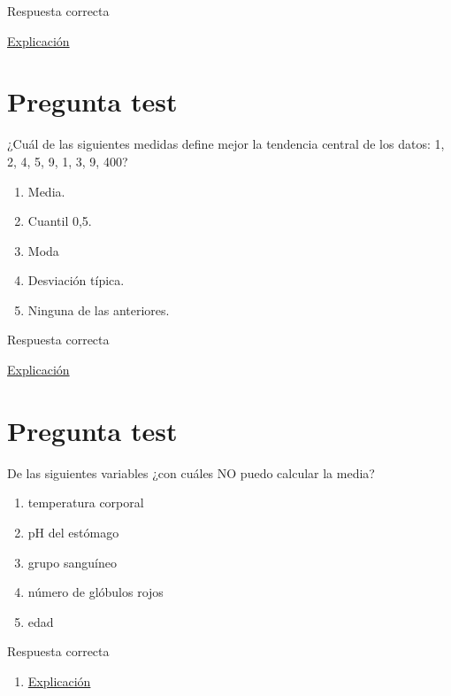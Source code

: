 \documentclass[
]{book}
\providecommand{\tightlist}{%
  \setlength{\itemsep}{0pt}\setlength{\parskip}{0pt}}
\begin{document}
Respuesta correcta

\href{https://1fjmanzano.github.io/bioestadistica/medidas-de-forma.html}{Explicación}

\hypertarget{pregunta-test-87}{%
\section{Pregunta test}\label{pregunta-test-87}}

¿Cuál de las siguientes medidas define mejor la tendencia central de los datos: 1, 2, 4, 5, 9, 1, 3, 9, 400?

\begin{enumerate}
\def\labelenumi{\alph{enumi})}
\tightlist
\item
  Media.
\item
  Cuantil 0,5.
\item
  Moda
\item
  Desviación típica.
\item
  Ninguna de las anteriores.
\end{enumerate}

Respuesta correcta

\href{https://1fjmanzano.github.io/bioestadistica/medidas-de-posicio\%CC\%81n-dispersio\%CC\%81n-y-forma.html\#medidas-de-posicio\%CC\%81n-no-centrales}{Explicación}

\hypertarget{pregunta-test-88}{%
\section{Pregunta test}\label{pregunta-test-88}}

De las siguientes variables ¿con cuáles NO puedo calcular la media?

\begin{enumerate}
\def\labelenumi{\alph{enumi})}
\tightlist
\item
  temperatura corporal
\item
  pH del estómago
\item
  grupo sanguíneo
\item
  número de glóbulos rojos
\item
  edad
\end{enumerate}

Respuesta correcta

\begin{enumerate}
\def\labelenumi{\alph{enumi})}
\setcounter{enumi}{2}
\tightlist
\item
  \href{https://1fjmanzano.github.io/bioestadistica/tipos-de-variables.html}{Explicación}
\end{enumerate}
\end{document}
